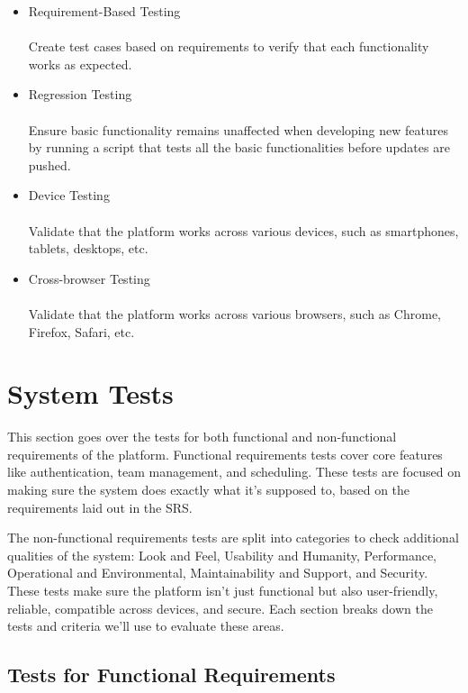 \documentclass[12pt, titlepage]{article}
\begin{document}
\begin{itemize}
    \item Requirement-Based Testing
          \\ \\ Create test cases based on requirements to verify that each functionality works as expected.

    \item Regression Testing
          \\ \\ Ensure basic functionality remains unaffected when developing new features by running a script that tests all the basic functionalities before updates are pushed.

    \item Device Testing
          \\ \\ Validate that the platform works across various devices, such as smartphones, tablets, desktops, etc.

    \item Cross-browser Testing
          \\ \\ Validate that the platform works across various browsers,
          such as Chrome, Firefox, Safari, etc.

\end{itemize}

\section{System Tests}

This section goes over the tests for both functional and non-functional requirements of the platform. Functional requirements tests cover core features like authentication, team management, and scheduling. These tests are focused on making sure the system does exactly what it’s supposed to, based on the requirements laid out in the SRS.

The non-functional requirements tests are split into categories to check additional qualities of the system: Look and Feel, Usability and Humanity, Performance, Operational and Environmental, Maintainability and Support, and Security. These tests make sure the platform isn’t just functional but also user-friendly, reliable, compatible across devices, and secure. Each section breaks down the tests and criteria we’ll use to evaluate these areas.

\subsection{Tests for Functional Requirements}
\end{document}
